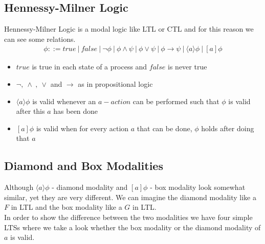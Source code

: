 \documentclass{clseminar}
\begin{document}
  \subsection{Hennessy-Milner Logic}
  Hennessy-Milner Logic is a modal logic like LTL or CTL and for this reason we can see some relations. \\
  \begin{align*}
    \phi ::= \mathit{true}\ |\ \mathit{false}\ |\ \neg \phi\ |\ \phi \land \psi\ |\ \phi \lor \psi\ |\ \phi \to \psi\ |\ \langle a \rangle \phi \ |\ [a]\phi
  \end{align*}
  \begin{itemize}
    \item $\mathit{true}$ is true in each state of a process and $\mathit{false}$ is never true
    \item $\neg ,\ \land\ ,\ \lor$ and $\to$ as in propositional logic
    \item $\langle a \rangle \phi$ is valid whenever an $a-action$ can be performed such that $\phi$ is valid after this $a$ has been done
    \item $[a]\phi$ is valid when for every action $a$ that can be done, $\phi$ holds after doing that $a$
  \end{itemize}

  \subsection{Diamond and Box Modalities}

  Although $\langle a \rangle \phi$ - diamond modality and $[a]\phi$ - box modality look somewhat similar, yet they are very different. We can imagine the diamond modality like a $F$ in LTL and the box modality like a $G$ in LTL. \\
  In order to show the difference between the two modalities we have four simple LTSs where we take a look whether the box modality or the diamond modality of $a$ is valid.
\end{document}
